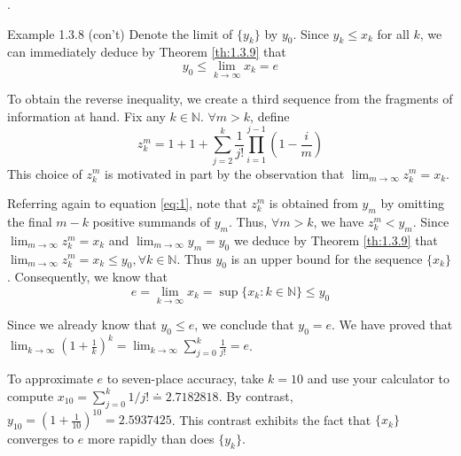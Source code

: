\documentclass[8pt]{beamer}
\newcounter{ex}
\newcommand{\mbb}[1]{\mathbb{#1}}
\begin{document}
\begin{frame}{.}
\begin{exampleblock}{Example 1.3.8 (con't)}
    Denote the limit of $\{y_k\}$ by $y_0$.
    Since $y_k \leq x_k$ for all $k$, we can immediately deduce by Theorem \ref{th:1.3.9} that
    \begin{equation*}
        y_0 \leq \lim_{k \to \infty} x_k = e
    \end{equation*}

    To obtain the reverse inequality, we create a third sequence from the fragments of information at hand.
    Fix any $k \in \mbb{N}$.
    $\forall m > k$, define
    \begin{equation*}
        z_k^m = 1+ 1+ \sum_{j=2}^{k} \frac{1}{j!} \prod_{i=1}^{j-1} \left(1 - \frac{i}{m}\right)
    \end{equation*}
    This choice of $z_k^m$ is motivated in part by the observation that $\lim_{m \to \infty} z_k^m = x_k$.

    Referring again to equation \ref{eq:1}, note that $z_k^m$ is obtained from $y_m$ by omitting the final $m-k$ positive summands of $y_m$.
    Thus, $\forall m>k$, we have $z_k^m< y_m$.
    Since $\lim_{m \to \infty} z_k^m = x_k$ and $\lim_{m \to \infty} y_m = y_0$ we deduce by Theorem \ref{th:1.3.9} that $\lim_{m \to \infty} z_k^m=x_k \leq y_0, \forall k \in \mbb{N}$.
    Thus $y_0$ is an upper bound for the sequence $\{x_k\}$.
    Consequently, we know that
    \begin{equation*}
        e = \lim_{k \to \infty} x_k = \sup \{x_k:k \in \mbb{N}\} \leq y_0
    \end{equation*}

    Since we already know that $y_0 \leq e$, we conclude that $y_0 = e$.
    We have proved that $\lim_{k \to \infty} (1+\frac{1}{k})^k = \lim_{k \to \infty} \sum_{j=0}^{k}\frac{1}{j!} = e$.

    To approximate $e$ to seven-place accuracy, take $k=10$ and use your calculator to compute $x_{10} = \sum_{j=0}^{k} 1/{j!} \doteq 2.7182818$.
    By contrast, $y_{10} = (1+\frac{1}{10})^10 = 2.5937425$. This contrast exhibits the fact that $\{x_k\}$ converges to $e$ more rapidly than does $\{y_k\}$.
\end{exampleblock}

\end{frame}
\end{document}
